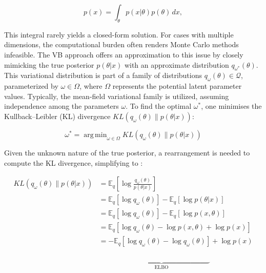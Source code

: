 \documentclass[3p,review,authoryear]{elsarticle}
\DeclareMathOperator*{\argmin}{arg\,min}
\begin{document}
\begin{equation}
p(x)=\int_{\theta} p(x|\theta)p(\theta) \,dx,
\label{eq:evidence}
\end{equation}

This integral rarely yields a closed-form solution.
For cases with multiple dimensions, the computational burden often renders Monte Carlo methods infeasible.
The VB approach offers an approximation to this issue by closely mimicking the true posterior $p(\theta|x)$ with an approximate distribution $q_{\omega^*}(\theta)$. This variational distribution is part of a family of distributions $q_\omega(\theta)\in \mathcal{Q}$, parameterized by $\omega \in \Omega$, where $\Omega$ represents the potential latent parameter values.
Typically, the mean-field variational family is utilized, assuming independence among the parameters $\omega$. 
To find the optimal $\omega^*$, one minimises the Kullback–Leibler (KL) divergence $KL(q_\omega(\theta) \parallel p(\theta|x))$:

\begin{equation}
\omega^* = \argmin_{\omega \in \Omega}KL(q_\omega(\theta) \parallel p(\theta|x))
\label{eq:optim}
\end{equation}

Given the unknown nature of the true posterior, a rearrangement is needed to compute the KL divergence, simplifying to :

\begin{align*}
KL(q_\omega(\theta) \parallel p(\theta|x)) &= \mathbb{E}_q\left[\log \frac{q_\omega (\theta)}{p(\theta|x)}\right] \\
&=\mathbb{E}_q\left[\log q_\omega(\theta)\right]-\mathbb{E}_q\left[\log p(\theta|x)\right]\\
&=\mathbb{E}_q\left[\log q_\omega(\theta)\right]-\mathbb{E}_q\left[\log p(x,\theta)\right]\\
&=\mathbb{E}_q[\log q_\omega(\theta) - \log p(x,\theta)+\log p(x)]\\
&=-\mathbb{E}_q\left[\log q_\omega(\theta) - \log q_\omega(\theta)\right] + \log p(x)\\
&\quad \quad \underbrace{\phantom{\mathbb{E}_q\left[\log q_\omega(\theta) - \log q_\omega(\theta)\right]}}_{\text{ELBO}}
\label{eq:kl_divergence}
\end{align*}
\end{document}
